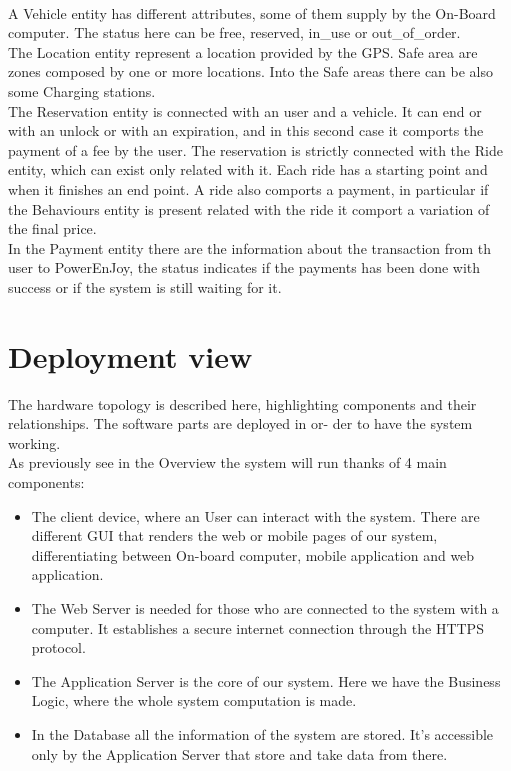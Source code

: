 \\A Vehicle entity has different attributes, some of them supply by the On-Board computer. The status here can be free, reserved, in_use or out_of_order.
\\The Location entity represent a location provided by the GPS. Safe area are zones composed by one or more locations. Into the Safe areas there can be also some Charging stations.
\\The Reservation entity is connected with an user and a vehicle. It can end or with an unlock or with an expiration, and in this second case it comports the payment of a fee by the user. The reservation is strictly connected with the Ride entity, which can exist only related with it. Each ride has a starting point and when it finishes an end point. A ride also comports a payment, in particular if the Behaviours entity is present related with the ride it comport a variation of the final price. 
\\In the Payment entity there are the information about the transaction from th user to PowerEnJoy, the status indicates if the payments has been done with success or if the system is still waiting for it.

\section{Deployment view}
The hardware topology is described here, highlighting components and their relationships. The software parts are deployed in or-
der to have the system working.
\\As previously see in the Overview the system will run thanks of 4 main components:
\begin{itemize}
	\item{The client device, where an User can interact with the system. There are different GUI that renders the web or mobile pages of our system, differentiating between On-board computer, mobile application and web application.}
	\item{ The Web Server is needed for those who are connected to the system with a computer. It establishes a secure internet connection through the HTTPS protocol.}
	\item{The Application Server is the core of our system. Here we have the Business Logic, where the whole system computation is
made.}
	\item{In the Database all the information of the system are stored. It's accessible only by the Application Server that store and take data from there.}
\end{itemize} 

